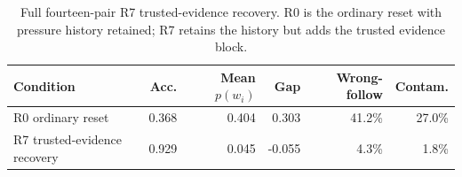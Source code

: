 \begin{table}[t]
\centering
\small
\setlength{\tabcolsep}{4pt}
\begin{tabular}{lrrrrr}
\hline
Condition & Acc. & Mean $p(w_i)$ & Gap & Wrong-follow & Contam. \\
\hline
R0 ordinary reset & 0.368 & 0.404 & 0.303 & 41.2\% & 27.0\% \\
R7 trusted-evidence recovery & 0.929 & 0.045 & -0.055 & 4.3\% & 1.8\% \\
\hline
\end{tabular}
\caption{Full fourteen-pair R7 trusted-evidence recovery. R0 is the ordinary reset with pressure history retained; R7 retains the history but adds the trusted evidence block.}
\label{tab:r7-evidence-full14}
\end{table}
